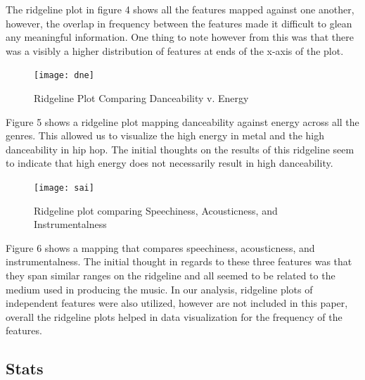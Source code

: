 \documentclass[11pt, a4paper, twocolumn]{article}
\begin{document}
The ridgeline plot in figure 4 shows all the features mapped against one another, however, the overlap in frequency between the features made it difficult to glean any meaningful information. One thing to note however from this was that there was a visibly a higher distribution of features at ends of the x-axis of the plot.
\begin{figure}[h!]
\texttt{[image: dne]}
\caption {Ridgeline Plot Comparing Danceability v. Energy}
\end{figure}

Figure 5 shows a ridgeline plot mapping danceability against energy across all the genres. This allowed us to visualize the high energy in metal and the high danceability in hip hop. The initial thoughts on the results of this ridgeline seem to indicate that high energy does not necessarily result in high danceability. 
\begin{figure}[h!]
\texttt{[image: sai]}
\caption{Ridgeline plot comparing Speechiness, Acousticness, and Instrumentalness}
\end{figure}

Figure 6 shows a mapping that compares speechiness, acousticness, and instrumentalness. The initial thought in regards to these three features was that they span similar ranges on the ridgeline and all seemed to be related to the medium used in producing the music. In our analysis, ridgeline plots of independent features were also utilized, however are not included in this paper, overall the ridgeline plots helped in data visualization for the frequency of the features. 

\subsection{Stats}
\end{document}
